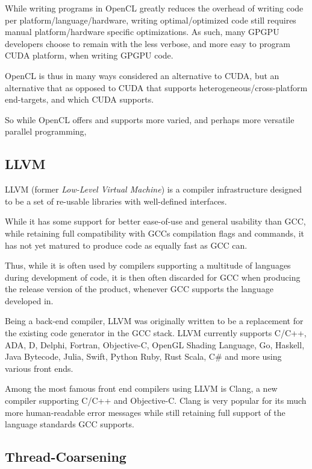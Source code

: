 While writing programs in OpenCL greatly reduces the overhead of writing code per platform/language/hardware, writing optimal/optimized code still requires manual platform/hardware specific optimizations.
As such, many GPGPU developers choose to remain with the less verbose, and more easy to program CUDA platform, when writing GPGPU code.

OpenCL is thus in many ways considered an alternative to CUDA, but an alternative that as opposed to CUDA that supports heterogeneous/cross-platform end-targets, and which CUDA supports.

So while OpenCL offers and supports more varied, and perhaps more versatile parallel programming,

\subsection{LLVM}

LLVM (former \textit{Low-Level Virtual Machine}) is a compiler infrastructure designed to be a set of re-usable libraries with well-defined interfaces.

While it has some support for better ease-of-use and general usability than GCC, while retaining full compatibility with GCCs compilation flags and commands, it has not yet matured to produce code as equally fast as GCC can.

Thus, while it is often used by compilers supporting a multitude of languages during development of code, it is then often discarded for GCC when producing the release version of the product, whenever GCC supports the language developed in.

Being a back-end compiler, LLVM was originally written to be a replacement for the existing code generator in the GCC stack.
LLVM currently supports C/C++, ADA, D, Delphi, Fortran, Objective-C, OpenGL Shading Language, Go, Haskell, Java Bytecode, Julia, Swift, Python Ruby, Rust Scala, C\# and more using various front ends.

Among the most famous front end compilers using LLVM is Clang, a new compiler supporting C/C++ and Objective-C.
Clang is very popular for its much more human-readable error messages while still retaining full support of the language standards GCC supports.

\subsection{Thread-Coarsening}

